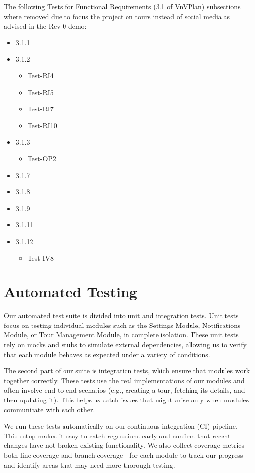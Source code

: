 \documentclass[12pt, titlepage]{article}
\begin{document}
The following Tests for Functional Requirements (3.1 of VnVPlan) subsections where removed due to focus the project on tours instead of social media as advised in the Rev 0 demo:
\begin{itemize}
  \item 3.1.1
  \item 3.1.2
        \begin{itemize}
          \item Test-RI4
          \item Test-RI5
          \item Test-RI7
          \item Test-RI10
        \end{itemize}
  \item 3.1.3
        \begin{itemize}
          \item Test-OP2
        \end{itemize}
  \item 3.1.7
  \item 3.1.8
  \item 3.1.9
  \item 3.1.11
  \item 3.1.12
        \begin{itemize}
          \item Test-IV8
        \end{itemize}
\end{itemize}

\section{Automated Testing}

Our automated test suite is divided into unit and integration tests. Unit tests focus on testing individual modules such as the Settings Module, Notifications Module, or Tour Management Module, in complete isolation. These unit tests rely on mocks and stubs to simulate external dependencies, allowing us to verify that each module behaves as expected under a variety of conditions.

The second part of our suite is integration tests, which ensure that modules work together correctly. These tests use the real implementations of our modules and often involve end-to-end scenarios (e.g., creating a tour, fetching its details, and then updating it). This helps us catch issues that might arise only when modules communicate with each other.

We run these tests automatically on our continuous integration (CI) pipeline. This setup makes it easy to catch regressions early and confirm that recent changes have not broken existing functionality. We also collect coverage metrics—both line coverage and branch coverage—for each module to track our progress and identify areas that may need more thorough testing.
\end{document}
